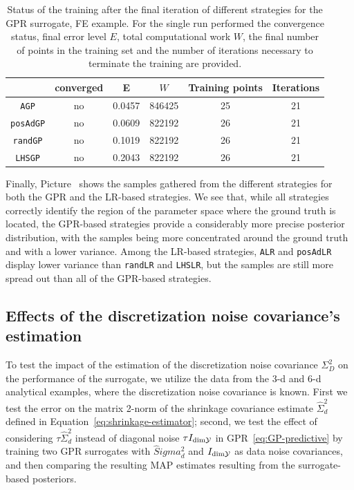 \begin{table}[H]
    \begin{centering}
    \begin{tabular}{cccccc}
    \toprule
        & converged   & E & $W$ & Training points    & Iterations \\ 
        \midrule
        \texttt{AGP}  
        & no & 0.0457 & 846425 &  25   &  21  \\
        \texttt{posAdGP}
        & no & 0.0609 & 822192 &  26   &  21 \\
        \texttt{randGP}
        & no & 0.1019 & 822192 &  26   &  21 \\
        \texttt{LHSGP}
        & no & 0.2043 & 822192 &  26   &  21 \\
    \bottomrule
    \end{tabular}
    \caption{Status of the training after the final iteration of different strategies for the GPR surrogate, FE example. For the single run performed the convergence status, final error level $E$, total computational work $W$, the final number of points in the training set and the number of iterations necessary to terminate the training are provided.
    }
    \label{tab:FE-LR-recap}
\end{centering}
\end{table} 

Finally, Picture~ shows the samples gathered from the different strategies for both the GPR and the LR-based strategies.
We see that, while all strategies correctly identify the region of the parameter space where the ground truth is located, the GPR-based strategies provide a considerably more precise posterior distribution, with the samples being more concentrated around the ground truth and with a lower variance.
Among the LR-based strategies, \texttt{ALR} and \texttt{posAdLR} display lower variance than \texttt{randLR} and \texttt{LHSLR}, but the samples are still more spread out than all of the GPR-based strategies.




\subsection[Effects of covariance estimation]{Effects of the discretization noise covariance's estimation}\label{sec:cov-est}

To test the impact of the estimation of the discretization noise covariance $\Sigma_D^2$ on the performance of the surrogate, we utilize the data from the 3-d and 6-d analytical examples, where the discretization noise covariance is known.
First we test the error on the matrix 2-norm of the shrinkage covariance estimate $\hat \Sigma_d^2$ defined in Equation~\eqref{eq:shrinkage-estimator}; second, we test the effect of considering $\tau \hat \Sigma_d^2$ instead of diagonal noise $\tau I_{\text{dim}\mathcal Y}$ in GPR~\eqref{eq:GP-predictive} by training two GPR surrogates with $\hat Sigma_d^2$ and $I_{\text{dim} \mathcal Y}$ as data noise covariances, and then comparing the resulting MAP estimates resulting from the surrogate-based posteriors.\medskip

